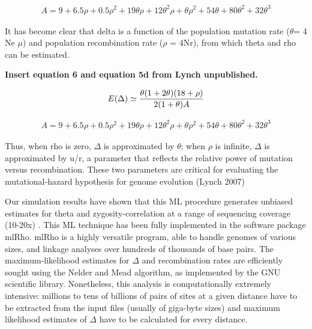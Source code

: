 \documentclass{sig-alternate}
\begin{document}
 \begin{eqnarray}
A = 9+6.5\rho + 0.5\rho^2+19\theta \rho+12\theta^2\rho+\theta \rho^2+54\theta+80\theta^2+32\theta^3
\label{eq:edelta}
\end{eqnarray}


It has become clear that delta is a function of the population mutation rate ($\theta$= 4 Ne $\mu$) and population recombination rate ($\rho$ = 4Nr), from which theta and rho can be estimated.

{\center \bf Insert equation 6 and equation 5d from Lynch unpublished.}


 \begin{eqnarray}
E(\Delta) \simeq {{\theta(1+2\theta)(18+\rho)} \over {2(1+\theta)A}}
\label{eq:edelta}
\end{eqnarray}

 \begin{eqnarray}
A = 9+6.5\rho + 0.5\rho^2+19\theta \rho+12\theta^2\rho+\theta \rho^2+54\theta+80\theta^2+32\theta^3
\label{eq:edelta}
\end{eqnarray}

Thus, when rho is zero, $\Delta$ is approximated by $\theta$; when $\rho$ is infinite, $\Delta$ is approximated by u/r, a parameter that reflects the relative power of mutation versus recombination. These two parameters are critical for evaluating the mutational-hazard hypothesis for genome evolution (Lynch 2007)

Our simulation results have shown that this ML procedure generates unbiased estimates for theta and zygosity-correlation at a range of sequencing coverage (10-20x) \cite{Lynch01112008}. 
This ML technique has been fully implemented in the software package mlRho. mlRho is a highly versatile program, able to handle genomes of various sizes, and linkage analyses over hundreds of thousands of base pairs. The maximum-likelihood estimates for $\Delta$ and recombination rates are efficiently sought using the Nelder and Mead algorithm, as implemented by the GNU scientific library. Nonetheless, this analysis is computationally extremely intensive: millions to tens of billions of pairs of sites at a given distance have to be extracted from the input files (usually of giga-byte sizes) and maximum likelihood estimates of $\Delta$ have to be calculated for every distance. 

\end{document}
